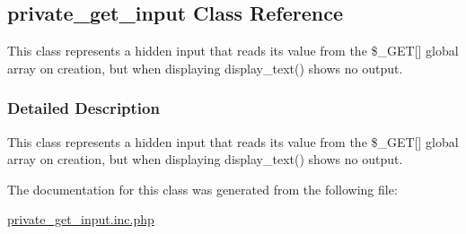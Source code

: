 \hypertarget{classprivate__get__input}{\subsection{private\-\_\-get\-\_\-input Class Reference}
\label{classprivate__get__input}
}


This class represents a hidden input that reads its value from the \$\-\_\-\-G\-E\-T\mbox{[}\mbox{]} global array on creation, but when displaying display\-\_\-text() shows no output.  




\subsubsection{Detailed Description}
This class represents a hidden input that reads its value from the \$\-\_\-\-G\-E\-T\mbox{[}\mbox{]} global array on creation, but when displaying display\-\_\-text() shows no output. 

The documentation for this class was generated from the following file\-:\begin{DoxyCompactItemize}
\item 
\hyperlink{private__get__input_8inc_8php}{private\-\_\-get\-\_\-input.\-inc.\-php}\end{DoxyCompactItemize}
